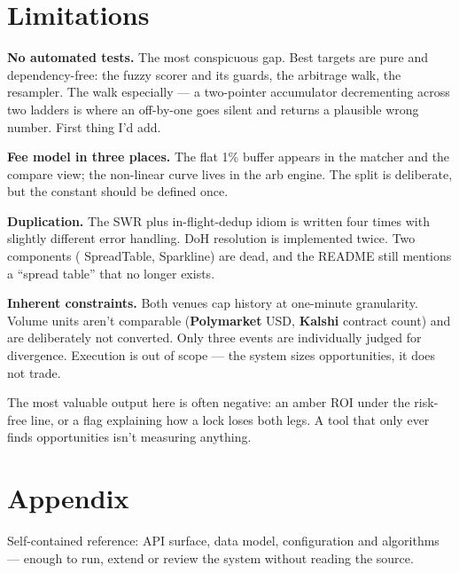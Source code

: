 \documentclass[11pt,a4paper]{article}
\newcommand{\file}[1]{{\ttfamily\small\color{slate} #1}}
\newcommand{\PM}{{\color{poly}\textbf{Polymarket}}}
\newcommand{\KS}{{\color{kalshi}\textbf{Kalshi}}}
\begin{document}
\section{Limitations}

\textbf{No automated tests.} The most conspicuous gap. Best targets are pure and
dependency-free: the fuzzy scorer and its guards, the arbitrage walk, the resampler. The walk
especially --- a two-pointer accumulator decrementing across two ladders is where an off-by-one
goes silent and returns a plausible wrong number. First thing I'd add.

\textbf{Fee model in three places.} The flat 1\% buffer appears in the matcher and the compare
view; the non-linear curve lives in the arb engine. The split is deliberate, but the constant
should be defined once.

\textbf{Duplication.} The SWR plus in-flight-dedup idiom is written four times with slightly
different error handling. DoH resolution is implemented twice. Two components
(\file{SpreadTable}, \file{Sparkline}) are dead, and the README still mentions a ``spread
table'' that no longer exists.

\textbf{Inherent constraints.} Both venues cap history at one-minute granularity. Volume units
aren't comparable (\PM{} USD, \KS{} contract count) and are deliberately not converted. Only
three events are individually judged for divergence. Execution is out of scope --- the system
sizes opportunities, it does not trade.

\medskip

The most valuable output here is often negative: an amber ROI under the risk-free line, or a
flag explaining how a lock loses both legs. A tool that only ever finds opportunities isn't
measuring anything.

\clearpage
\appendix
\renewcommand{\thesection}{\Alph{section}}
\section*{Appendix}

\begin{keybox}
Self-contained reference: API surface, data model, configuration and algorithms --- enough to
run, extend or review the system without reading the source.
\end{keybox}
\end{document}
